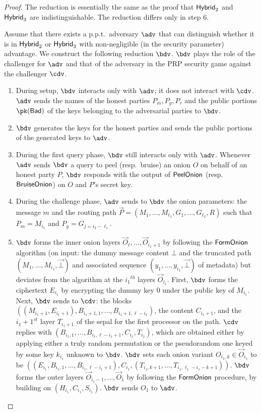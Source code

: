 \documentclass[runningheads,a4paper]{llncs}
\begin{document}
\begin{proof}
The reduction is essentially the same as the proof that $\mathsf{Hybrid}_{2}$ and $\mathsf{Hybrid}_{3}$ are indistinguishable. The reduction differs only in step 6.  

Assume that there exists a p.p.t.~adversary $\adv$ that can distinguish whether it is in $\mathsf{Hybrid}_{2}$ or $\mathsf{Hybrid}_{3}$ with non-negligible (in the security parameter)  advantage. 
We construct the following reduction $\bdv$. $\bdv$ plays the role of the challenger for $\adv$ and that of the adversary in the PRP security game against the  challenger $\cdv$. 

\begin{enumerate}
\item During setup, $\bdv$ interacts only with $\adv$; it does not interact with $\cdv$. $\adv$ sends the names of the honest parties $P_m, P_g, P_r$ and the public portions $\pk(\Bad)$ of the keys  belonging to the adversarial parties to $\bdv$. 

\item $\bdv$ generates the keys for the honest parties and sends the public portions of the generated keys to $\adv$. 

\item During the first query phase, $\bdv$ still interacts only with $\adv$. Whenever $\adv$ sends $\bdv$ a query to peel (resp.~bruise) an onion $O$ on behalf of an honest party $P$, $\bdv$ responds with the output of $\mathsf{PeelOnion}$ (resp.~$\mathsf{BruiseOnion}$) on $O$ and $P$'s secret key. 

\item During the challenge phase, $\adv$ sends to $\bdv$ the onion parameters: the message $m$ and the routing path $\vec{P} = (M_1, \dots, M_{\ell_1}, G_1, \dots, G_{\ell_2}, R)$ such that $P_m = M_{i_1}$ and $P_g = G_{j=i_2-\ell_1}$. 

\item $\bdv$ forms the inner onion layers $\vec{O}_\ell, \dots, \vec{O}_{i_1+1}$ by following the $\mathsf{FormOnion}$ algorithm (on input: the dummy message content $\bot$ and the truncated path $(M_1, \dots, M_{i_1}, \vec{\bot})$ and associated sequence $(y_1, \dots, y_{i_1}, \vec{\bot})$ of metadata) but deviates from the algorithm at the ${i_1}^\mathit{th}$ layers $\vec{O}_{i_1}$.  
First, $\bdv$ forms the ciphertext $E_{i_1}$ by encrypting the dummy key $0$ under the public key of $M_{i_1}$. 
Next, $\bdv$ sends to $\cdv$: the blocks  $((M_{i_1+1},E_{i_1+1}), B_{i_1+1,1}, \dots, B_{i_1+1, \ell-i_1})$, the content $C_{i_1+1}$, and the $i_1+1^\mathit{st}$ layer $T_{i_1+1}$ of the sepal for the first processor on the path. $\cdv$ replies with $(B_{i_1, 1}, \dots, B_{i_1, \ell-i_1+1}, C_{i_1}, T_{i_1})$, which are obtained either by applying either a truly random permutation or the pseudorandom one keyed by some key $k_{i_1}$ unknown to $\bdv$. $\bdv$ sets  each onion variant $O_{i_1, k} \in \vec{O}_{i_1}$ to be $((E_{i_1}, B_{i_1, 1}, \dots, B_{i_1, \ell-i_1+1}), C_{i_1}, (T_{i_1, k+1}, \dots, T_{i_1, \ell_1-i_1-k+1}))$. $\bdv$ forms the outer layers $\vec{O}_{i_1-1}, \dots, \vec{O}_1$ by following the $\mathsf{FormOnion}$ procedure, by building on $(H_{i_1}, C_{i_1}, S_{i_1})$. $\bdv$ sends $O_1$ to $\adv$.  


\end{enumerate}
\end{proof}
\end{document}

